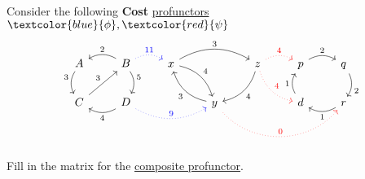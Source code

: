 Consider the following \textbf{Cost} \href{doc/1 math/Seven Sketches in Compositionality/Chapter 4: Co-design/2 Enriched profunctors/2 V-profunctors/1 V-profunctor}{profunctors} $\textcolor{blue}{\phi},\textcolor{red}{\psi}$ \[
      \begin{tikzcd}[ampersand replacement=\&]
        A \arrow[d, "3"', bend right] \& B \arrow[l, "2"', bend right] \arrow[d, "5", bend left] \arrow[r, "11", blue, dotted, bend left] \& x \arrow[rr, "3", bend left] \arrow[rd, "4", bend left] \&                                                                      \& z \arrow[ld, "4", bend left] \arrow[r, "4", red,dotted, bend left] \arrow[rd, red, "4", dotted, bend right] \& p \arrow[r, "2", bend left] \& q \arrow[d, "2", bend left] \\
        C \arrow[ru, "3"]             \& D \arrow[l, "4", bend left] \arrow[rr, blue, "9", dotted, bend right]                            \&                                                         \& y \arrow[lu, "3", bend left] \arrow[rrr, red, "0", dotted, bend right=49] \&                                                                                                    \& d \arrow[u, "1", bend left] \& r \arrow[l, "1", bend left]
      \end{tikzcd}
    \]

    Fill in the matrix for the \href{doc/1 math/Seven Sketches in Compositionality/Chapter 4: Co-design/3 Categories of profunctors/1 Composing profunctors/1 V-profunctor composition}{composite profunctor}.